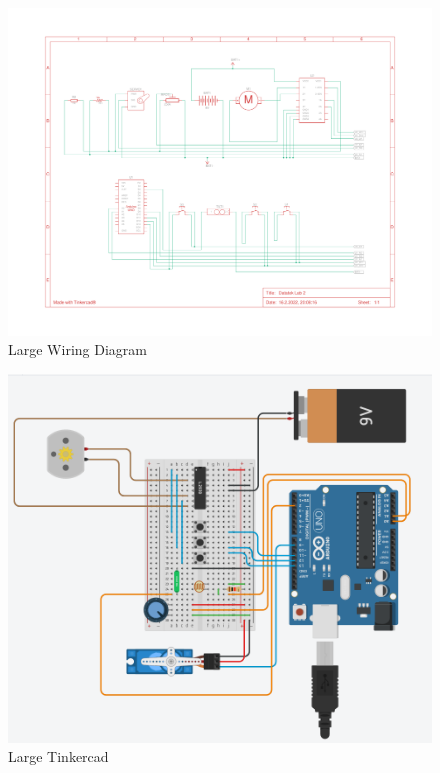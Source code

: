 \documentclass[journal]{IEEEtran}
\begin{document}
\begin{landscape}
    \begin{figure}[h]%
        \begin {center}
        \includegraphics[width=1.5\textwidth, trim={0 2cm 0 2cm}]{images/wiring-diagram.pdf}
        \caption{Large Wiring Diagram}
        \label{fig:wiringLarge}
        \end {center}
    \end{figure}

    \begin{figure}[h]%
        \begin {center}
        \includegraphics[width=1.2\textwidth]{images/tinkercad.PNG}
        \caption{Large Tinkercad}
        \label{fig:tinkercadLarge}
        \end {center}
    \end{figure}

\end{landscape}
\end{document}
